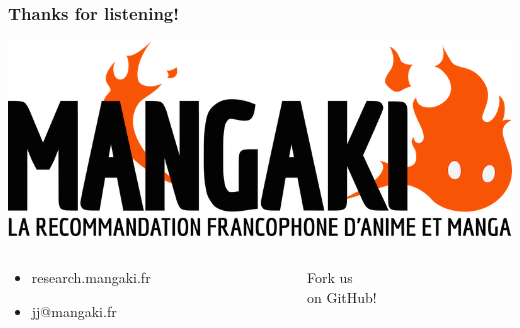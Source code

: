 \documentclass[handout]{beamer}
\begin{document}
\begin{frame}
	\frametitle{Thanks for listening!}
	\includegraphics[width=\linewidth]{figures/mangaki.png}
	\vspace{5mm}
	\begin{columns}
	\begin{column}{0.5\textwidth}
	\begin{itemize}
	\item research.mangaki.fr\bigskip\\
	\item jj@mangaki.fr
	\end{itemize}\bigskip
	\end{column}
	\begin{column}{0.5\textwidth}
	\centering
	\huge Fork us\\on GitHub\!!
	\end{column}
	\end{columns}
	
\end{frame}
\end{document}

